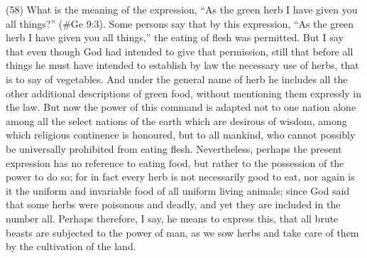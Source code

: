 (58) What is the meaning of the expression, ``As the green herb I have given you all things?''
(\#Ge 9:3). Some persons say that by this expression, ``As the green herb I have given you all
things,'' the eating of flesh was permitted. But I say that even though God had intended to give that
permission, still that before all things he must have intended to establish by law the necessary use
of herbs, that is to say of vegetables. And under the general name of herb he includes all the other
additional descriptions of green food, without mentioning them expressly in the law. But now the
power of this command is adapted not to one nation alone among all the select nations of the earth
which are desirous of wisdom, among which religious continence is honoured, but to all mankind,
who cannot possibly be universally prohibited from eating flesh. Nevertheless, perhaps the present
expression has no reference to eating food, but rather to the possession of the power to do so; for
in fact every herb is not necessarily good to eat, nor again is it the uniform and invariable food of
all uniform living animals; since God said that some herbs were poisonous and deadly, and yet they
are included in the number all. Perhaps therefore, I say, he means to express this, that all brute
beasts are subjected to the power of man, as we sow herbs and take care of them by the
cultivation of the land.


